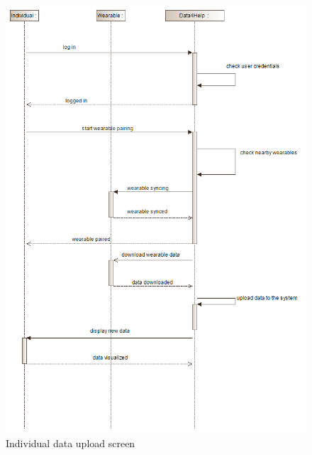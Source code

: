 \begin{figure}[p]
	\centering
  \includegraphics[width=0.79\linewidth]{resources/UML/IndividualInteraction.png}
  \caption{Individual data upload screen}
  \label{fig:Individual sequence diagram}
\end{figure}

